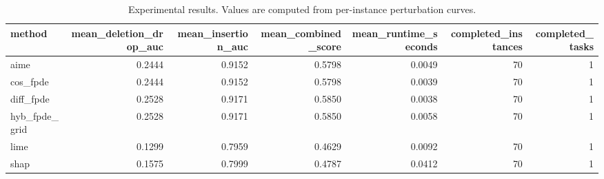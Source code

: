 \begin{table}[t]
\caption{Experimental results. Values are computed from per-instance perturbation curves.}
\label{tab:main_results_computed}
\centering
\begin{tabular}{lrrrrrr}
\toprule
method & mean\_deletion\_drop\_auc & mean\_insertion\_auc & mean\_combined\_score & mean\_runtime\_seconds & completed\_instances & completed\_tasks \\
\midrule
aime & 0.2444 & 0.9152 & 0.5798 & 0.0049 & 70 & 1 \\
cos\_fpde & 0.2444 & 0.9152 & 0.5798 & 0.0039 & 70 & 1 \\
diff\_fpde & 0.2528 & 0.9171 & 0.5850 & 0.0038 & 70 & 1 \\
hyb\_fpde\_grid & 0.2528 & 0.9171 & 0.5850 & 0.0058 & 70 & 1 \\
lime & 0.1299 & 0.7959 & 0.4629 & 0.0092 & 70 & 1 \\
shap & 0.1575 & 0.7999 & 0.4787 & 0.0412 & 70 & 1 \\
\bottomrule
\end{tabular}

\end{table}

